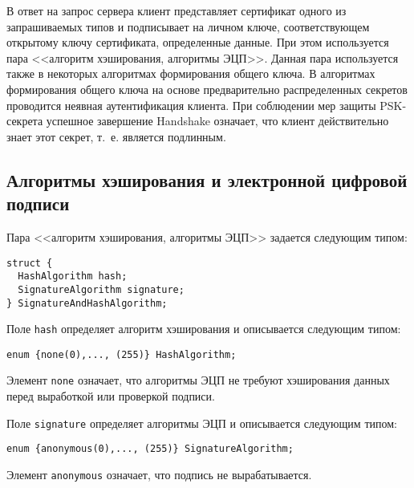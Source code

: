 В ответ на запрос сервера клиент представляет сертификат одного из 
запрашиваемых типов и подписывает на личном ключе, соответствующем 
открытому ключу сертификата, определенные данные. При этом используется 
пара <<алгоритм хэширования, алгоритмы ЭЦП>>. Данная пара используется 
также в некоторых алгоритмах формирования общего ключа. 
В алгоритмах формирования общего ключа на основе предварительно 
распределенных секретов проводится неявная аутентификация клиента. При 
соблюдении мер защиты PSK-секрета успешное завершение 
Handshake означает, что клиент действительно знает этот 
секрет, т.~е. является подлинным.  

\subsection{Алгоритмы хэширования и электронной цифровой 
подписи}\label{CRYPTO.3.3}

Пара <<алгоритм хэширования, алгоритмы ЭЦП>> задается следующим типом:
\begin{lstlisting}
struct {
  HashAlgorithm hash;
  SignatureAlgorithm signature;
} SignatureAndHashAlgorithm;
\end{lstlisting}

Поле \lstinline{hash} определяет алгоритм хэширования и описывается 
следующим типом:  
\begin{lstlisting}
enum {none(0),..., (255)} HashAlgorithm;
\end{lstlisting}

Элемент \lstinline{none} означает, что алгоритмы ЭЦП не требуют 
хэширования данных перед выработкой или проверкой подписи.  

Поле \lstinline{signature} определяет алгоритмы ЭЦП и описывается 
следующим типом: 
\begin{lstlisting}
enum {anonymous(0),..., (255)} SignatureAlgorithm;
\end{lstlisting}

Элемент \lstinline{anonymous} означает, что подпись не вырабатывается.
